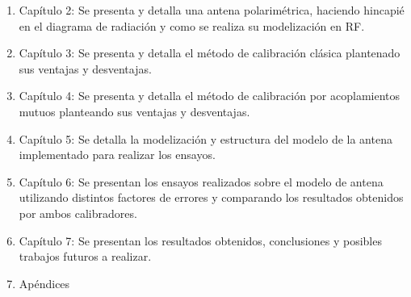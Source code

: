 \begin{enumerate}
	\item Capítulo 2: Se presenta y detalla una antena polarimétrica, haciendo hincapié en el diagrama de radiación y como
    se realiza su modelización en RF.
	\item Capítulo 3: Se presenta y detalla el método de calibración clásica plantenado sus ventajas y desventajas.
	\item Capítulo 4: Se presenta y detalla el método de calibración por acoplamientos mutuos planteando sus ventajas y
		desventajas.
	\item Capítulo 5: Se detalla la modelización y estructura del modelo de la antena implementado para realizar los ensayos.
	\item Capítulo 6: Se presentan los ensayos realizados sobre el modelo de antena utilizando distintos factores de errores y
		comparando los resultados obtenidos por ambos calibradores.
	\item Capítulo 7: Se presentan los resultados obtenidos, conclusiones y posibles trabajos futuros a realizar.
	\item Apéndices
\end{enumerate}

